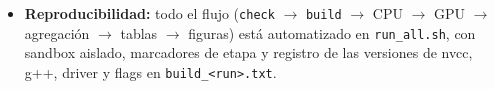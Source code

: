 \begin{itemize}
		\item \textbf{Reproducibilidad:} todo el flujo (\texttt{check} $\to$ \texttt{build} $\to$ CPU $\to$ GPU $\to$ agregación $\to$ tablas $\to$ figuras) está automatizado en \texttt{run\_all.sh}, con sandbox aislado, marcadores de etapa y registro de las versiones de nvcc, g++, driver y flags en \texttt{build\_\textless run\textgreater{}.txt}.
	\end{itemize}
